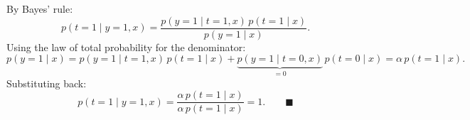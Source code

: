 \begin{answer}
By Bayes' rule:
\[
p(t=1\mid y=1, x)
= \frac{p(y=1\mid t=1,x)\,p(t=1\mid x)}{p(y=1\mid x)}.
\]
Using the law of total probability for the denominator:
\[
p(y=1\mid x) = p(y=1\mid t=1,x)\,p(t=1\mid x) + \underbrace{p(y=1\mid t=0,x)}_{=0}\,p(t=0\mid x)
= \alpha\,p(t=1\mid x).
\]
Substituting back:
\[
p(t=1\mid y=1,x)
= \frac{\alpha\,p(t=1\mid x)}{\alpha\,p(t=1\mid x)} = 1. \qquad \blacksquare
\]
\end{answer}
